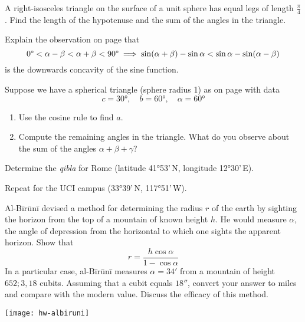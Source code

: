 \begin{exercises}{}{}
	\exstart A right-isosceles triangle on the surface of a unit sphere has equal legs of length $\frac\pi 4$. Find the length of the hypotenuse and the sum of the angles in the triangle. 
	\begin{enumerate}\setcounter{enumi}{1}
	  \item Explain the observation on page \pageref{pg:sineconcave} that
		\[
			\ang 0<\alpha-\beta<\alpha+\beta<\ang{90}
			\implies\sin(\alpha+\beta)-\sin\alpha<\sin\alpha-\sin(\alpha-\beta)
		\]
		is the downwards concavity of the sine function.
		
		\item Suppose we have a spherical triangle (sphere radius 1) as on page \pageref{pg:qiblacosinerule} with data
		\[
			c=\ang{30},\quad b=\ang{60},\quad \alpha=\ang{60}
		\]
		\begin{enumerate}
		  \item Use the cosine rule to find $a$.
		  \item Compute the remaining angles in the triangle. What do you observe about the sum of the angles $\alpha+\beta+\gamma$?
		\end{enumerate}
	
	  \item%
		Determine the \emph{qibla} for Rome (latitude \ang{41}53'\,N, longitude \ang{12}30'\,E).\par
		Repeat for the UCI campus (\ang{33}39'\,N, \ang{117}51'\,W).
	  
	  \begin{minipage}[t]{0.7\linewidth}\vspace{0pt}
		\item%
		Al-Bīrūnī devised a method for determining the radius $r$ of the earth by sighting the horizon from the top of a mountain of known height $h$. He would measure $\alpha$, the angle of depression from the horizontal to which one sights the apparent horizon. Show that
	  \[
	  	r=\frac{h\cos\alpha}{1-\cos\alpha}
	  \]
	  In a particular case, al-Bīrūnī measures $\alpha=34'$ from a mountain of height $652;3,18$ cubits. Assuming that a cubit equals $18''$, convert your answer to miles and compare with the modern value. Discuss the efficacy of this method.
	  \end{minipage}
	  \hfill
	  \begin{minipage}[t]{0.29\linewidth}\vspace{0pt}
	  	\flushright
	  	\texttt{[image: hw-albiruni]}
	  \end{minipage}
	  

\end{enumerate}
\end{exercises}
